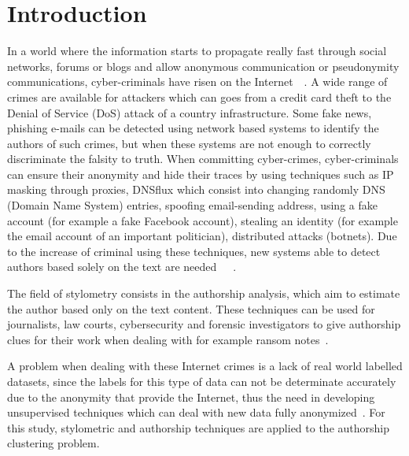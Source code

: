 
\section{Introduction \label{sec:introduction}}

In a world where the information starts to propagate really fast through social networks, forums or blogs and allow anonymous communication or pseudonymity communications, cyber-criminals have risen on the Internet~\cite{automated_unsupervised}~\cite{kocher_pan16}.
A wide range of crimes are available for attackers which can goes from a credit card theft to the Denial of Service (DoS) attack of a country infrastructure.
Some fake news, phishing e-mails can be detected using network based systems to identify the authors of such crimes, but when these systems are not enough to correctly discriminate the falsity to truth.
When committing cyber-crimes, cyber-criminals can ensure their anonymity and hide their traces by using techniques such as IP masking through proxies, DNSflux which consist into changing randomly DNS (Domain Name System) entries, spoofing email-sending address, using a fake account (for example a fake Facebook account), stealing an identity (for example the email account of an important politician), distributed attacks (botnets).
Due to the increase of criminal using these techniques, new systems able to detect authors based solely on the text are needed~\cite{attribution_in_cyberspace}~\cite{automated_unsupervised}~\cite{unine_pan20_fake_news}.

The field of stylometry consists in the authorship analysis, which aim to estimate the author based only on the text content.
These techniques can be used for journalists, law courts, cybersecurity and forensic investigators to give authorship clues for their work when dealing with for example ransom notes~\cite{pan16_clustering_site}.

A problem when dealing with these Internet crimes is a lack of real world labelled datasets, since the labels for this type of data can not be determinate accurately due to the anonymity that provide the Internet, thus the need in developing unsupervised techniques which can deal with new data fully anonymized~\cite{automated_unsupervised}.
For this study, stylometric and authorship techniques are applied to the authorship clustering problem.

